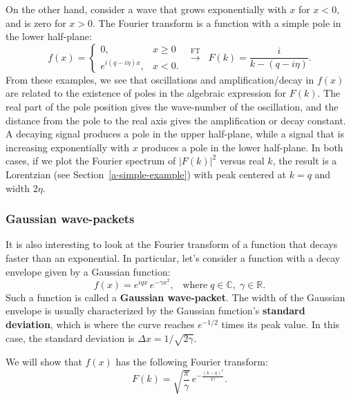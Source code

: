 \documentclass[10pt,a4paper]{article}
\begin{document}
On the other hand, consider a wave that grows exponentially with $x$
for $x < 0$, and is zero for $x > 0$. The Fourier transform is a
function with a simple pole in the lower half-plane:
\begin{equation}
f(x) = \left\{\begin{array}{cl}0, & x \ge 0 \\ e^{i (q - i\eta) x}, & x < 0.\end{array}\right. \;\;  \overset{\mathrm{FT}}{\longrightarrow} \;\; F(k) = \frac{i}{k-(q - i\eta)}.
\end{equation}
From these examples, we see that oscillations and amplification/decay
in $f(x)$ are related to the existence of poles in the algebraic
expression for $F(k)$. The real part of the pole position gives the
wave-number of the oscillation, and the distance from the pole to the
real axis gives the amplification or decay constant. A decaying signal
produces a pole in the upper half-plane, while a signal that is
increasing exponentially with $x$ produces a pole in the lower
half-plane. In both cases, if we plot the Fourier spectrum of
$|F(k)|^2$ versus real $k$, the result is a Lorentzian (see
Section~\ref{a-simple-example}) with peak centered at $k = q$ and
width $2\eta$.

\subsubsection{Gaussian wave-packets}\label{gaussian-wave-packets}

It is also interesting to look at the Fourier transform of a function
that decays faster than an exponential. In particular, let's consider
a function with a decay envelope given by a Gaussian function:
\begin{equation}
f(x) = e^{iq x} \, e^{-\gamma x^2}, \;\;\;\mathrm{where}\; q \in \mathbb{C},\; \gamma \in \mathbb{R}.
\end{equation}
Such a function is called a \textbf{Gaussian wave-packet}. The width of
the Gaussian envelope is usually characterized by the Gaussian
function's \textbf{standard deviation}, which is where the curve reaches
$e^{-1/2}$ times its peak value. In this case, the standard deviation
is $\Delta x = 1/\sqrt{2\gamma}$.

We will show that $f(x)$ has the following Fourier transform:
\begin{equation}
F(k) = \sqrt{\frac{\pi}{\gamma}} \, e^{-\frac{(k-q)^2}{4\gamma}}.
\end{equation}
\end{document}
